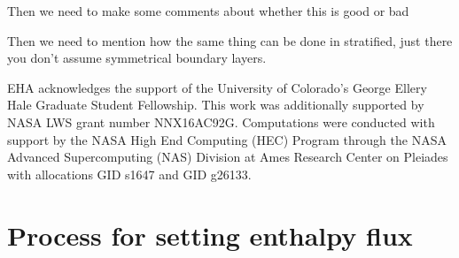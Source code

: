 \documentclass[aps, pre, onecolumn, nofootinbib, notitlepage, groupedaddress, amsfonts, amssymb, amsmath, longbibliography]{revtex4-1}
\begin{document}
Then we need to make some comments about whether this is good or bad

Then we need to mention how the same thing can be done in stratified, just there you don't
assume symmetrical boundary layers.





\begin{acknowledgments}
EHA acknowledges the support of the University of Colorado's George 
Ellery Hale Graduate Student Fellowship.
This work was additionally supported by  NASA LWS grant number NNX16AC92G.  
Computations were conducted 
with support by the NASA High End Computing (HEC) Program through the NASA 
Advanced Supercomputing (NAS) Division at Ames Research Center on Pleiades
with allocations GID s1647 and GID g26133.
\end{acknowledgments}


\appendix
\section{Process for setting enthalpy flux}



\end{document}
